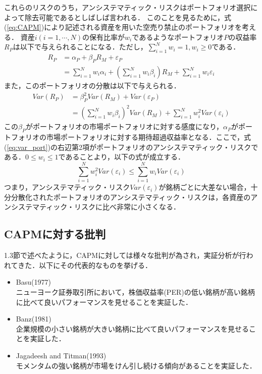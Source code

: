 ﻿\documentclass[a4paper]{jarticle}
\begin{document}
これらのリスクのうち，アンシステマティック・リスクはポートフォリオ選択によって除去可能であるとしばしば言われる．
このことを見るために，式(\ref{eq:CAPM})により記述される資産を用いた空売り禁止のポートフォリオを考える．
資産$i(i=1,\cdots,N)$の保有比率が$w_i$であるようなポートフォリオ$P$の収益率$R_P$は以下で与えられることになる．ただし，$\sum_{i=1}^N w_i = 1, w_i\geq0$である．
\begin{equation}
\begin{split}
R_P &= \alpha_P + \beta_PR_M + \varepsilon_P\\
&= \sum_{i=1}^N w_i\alpha_i
+\left(\sum_{i=1}^N w_i\beta_i\right)R_M
+\sum_{i=1}^N w_i\varepsilon_i
\end{split}
\end{equation}
また，このポートフォリオの分散は以下で与えられる．
\begin{equation}
\begin{split}
Var(R_P) &= \beta_P^2 Var(R_M) + Var(\varepsilon_P)\\
& = \left(\sum_{i=1}^N w_i\beta_i\right)^2Var(R_M) + \sum_{i=1}^N w_i^2 Var(\varepsilon_i)
\label{eq:var_port}
\end{split}
\end{equation}
この$\beta_P$がポートフォリオの市場ポートフォリオに対する感度になり，$\alpha_P$がポートフォリオの市場ポートフォリオに対する期待超過収益率となる．ここで，式(\ref{eq:var_port})の右辺第2項がポートフォリオのアンシステマティック・リスクである．$0\leq w_i \leq 1$であることより，以下の式が成立する．
\begin{equation}
\sum_{i=1}^N w_i^2Var(\varepsilon_i) \leq \sum_{i=1}^N w_iVar(\varepsilon_i)
\end{equation}
つまり，アンシステマティック・リスク$Var(\varepsilon_i)$が銘柄ごとに大差ない場合，十分分散化されたポートフォリオのアンシステマティック・リスクは，各資産のアンシステマティック・リスクに比べ非常に小さくなる．



\subsection{CAPMに対する批判}
1.3節で述べたように，CAPMに対しては様々な批判が為され，実証分析が行われてきた．以下にその代表的なものを挙げる．
\begin{itemize}
\item Basu(1977)\cite{Basu}\\
ニューヨーク証券取引所において，株価収益率(PER)の低い銘柄が高い銘柄に比べて良いパフォーマンスを見せることを実証した．
\item Banz(1981)\cite{Banz}\\
企業規模の小さい銘柄が大きい銘柄に比べて良いパフォーマンスを見せることを実証した．
\item Jagadeesh and Titman(1993)\cite{Jagadeesh}\\
モメンタムの強い銘柄が市場をけん引し続ける傾向があることを実証した．
\end{itemize}
\end{document}
